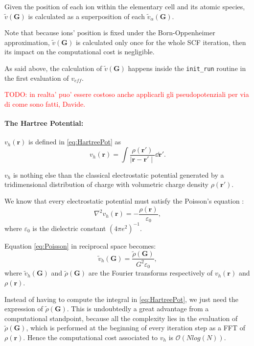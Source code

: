 \documentclass[a4paper,12pt]{article}
\newcommand\mynotes[1]{\begin{flushright}

\textcolor{red}{TODO: #1}\end{flushright}}
\newcommand\mf[1]{\mathbf{#1}}
\newcommand\dens{\rho(\mathbf{r})}
\newcommand\erre{\mathbf{r}}
\newcommand\GI{\mathbf{G}}
\newcommand\bigO{\mathcal{O}}
\begin{document}
Given the position of each ion within the elementary cell and its atomic species, $\tilde{v}(\mf{G})$ is calculated as a superposition of each $\tilde{v}_{\alpha}(\mf{G})$.

Note that because ions' position is fixed under the Born-Oppenheimer approximation, $\tilde{v}(\mf{G})$ is calculated only once for the whole SCF iteration, then its impact on the computational cost is negligible.  

As said above, the calculation of $\tilde{v}(\GI)$ happens inside the \texttt{init\_run} routine in the first evaluation of $v_{eff}$.

\mynotes{in realta' puo' essere costoso anche applicarli gli pseudopotenziali per via di come sono fatti, Davide.}

\paragraph{The Hartree Potential:}

$v_{h}(\erre)$ is defined in \eqref{eq:HartreePot} as 
\begin{equation}
 v_{h}(\erre) = \int \frac{\rho(\mathbf{r'})}{\mid \mathbf{r} - \mathbf{r'} \mid}  \dd{\mathbf{r'}}.
\end{equation}

$v_{h}$ is nothing else than the classical electrostatic potential generated by a tridimensional distribution of charge with volumetric charge density $\rho(\erre')$.

We know that every electrostatic potential must satisfy the Poisson's equation :
\begin{equation}\label{eq:Poisson}
	\nabla^2 v_{h}(\erre) = - \frac{\dens}{\varepsilon_{0}},
\end{equation} 
where $\varepsilon_{0}$ is the dielectric constant $(4\pi e^2)^{-1}$.

Equation \eqref{eq:Poisson} in reciprocal space becomes:
\begin{equation}\label{eq:HartreePotReciprocal}
	\tilde{v}_{h}(\mf{G}) = \frac{\tilde{\rho}(\mf{G})}{G^2 \varepsilon_{0}},
\end{equation}
where $\tilde{v}_{h}(\mf{G})$ and $\tilde{\rho}(\mf{G})$ are the Fourier transforms respectively of $v_{h}(\erre)$ and $\dens$.

Instead of having to compute the integral in \eqref{eq:HartreePot}, we just need the expression of $\tilde{\rho}(\mf{G})$.
This is undoubtedly a great advantage from a computational standpoint, because all the complexity lies in the evaluation of $\tilde{\rho}(\mf{G})$, which is performed at the beginning of every iteration step as a FFT of $\dens$.
Hence the computational cost associated to $v_{h}$ is $\bigO(N log(N))$.
\end{document}
